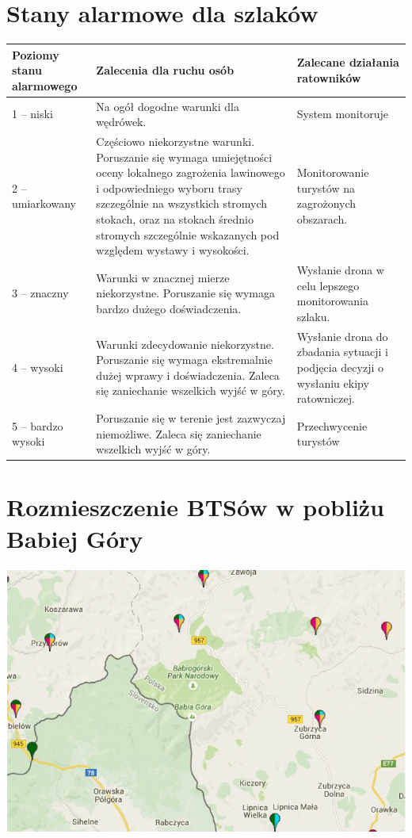 \documentclass[a4paper,12pt]{article}
\begin{document}
\section{Stany alarmowe dla szlaków}
\begin{center}
\begin{longtable}{ | p{4cm} | p{5cm} | p{5cm} | }
\hline
	\textbf{Poziomy stanu alarmowego} & \textbf{Zalecenia dla ruchu osób} & \textbf{Zalecane działania ratowników} \\\hline
	1 -- niski & Na ogół dogodne warunki dla
wędrówek. & System monitoruje \\\hline
	2 -- umiarkowany & Częściowo niekorzystne warunki.
Poruszanie się wymaga
umiejętności oceny lokalnego
zagrożenia lawinowego i
odpowiedniego wyboru trasy
szczególnie na wszystkich
stromych stokach, oraz na
stokach średnio stromych
szczególnie wskazanych pod
względem wystawy i wysokości. & Monitorowanie turystów
na zagrożonych
obszarach. \\\hline
 3 -- znaczny & Warunki w znacznej mierze
niekorzystne. Poruszanie się
wymaga bardzo dużego
doświadczenia. & Wysłanie drona w celu
lepszego monitorowania
szlaku. \\\hline
4 -- wysoki & Warunki zdecydowanie
niekorzystne. Poruszanie się
wymaga ekstremalnie dużej
wprawy i doświadczenia. Zaleca
się zaniechanie wszelkich wyjść
w góry. & Wysłanie drona do
zbadania sytuacji i
podjęcia decyzji o
wysłaniu ekipy
ratowniczej. \\\hline
5 -- bardzo wysoki & Poruszanie się w terenie jest
zazwyczaj niemożliwe. Zaleca się
zaniechanie wszelkich wyjść w
góry. & Przechwycenie turystów \\\hline
\end{longtable}
\end{center}
\section{Rozmieszczenie BTSów w pobliżu Babiej Góry}
\includegraphics[scale=0.75]{bts.png}
\newpage
\end{document}
